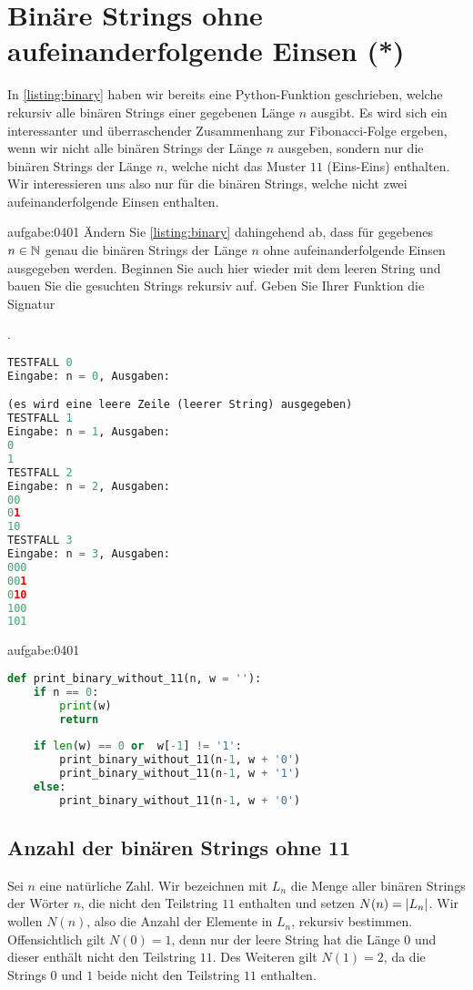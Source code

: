 \chapter{Binäre Strings ohne aufeinanderfolgende Einsen (*)}\label{ch:Kapitel04}
In \cref{listing:binary} haben wir bereits eine Python-Funktion geschrieben, welche rekursiv alle binären Strings einer gegebenen Länge $n$ ausgibt. Es wird sich ein interessanter und überraschender Zusammenhang zur Fibonacci-Folge ergeben, wenn wir nicht alle binären Strings der Länge $n$ ausgeben, sondern nur die binären Strings der Länge $n$, welche nicht das Muster $11$ (Eins-Eins) enthalten. Wir interessieren uns also nur für die binären Strings, welche nicht zwei aufeinanderfolgende Einsen enthalten.
\begin{aufgabe}{aufgabe:0401}
Ändern Sie \cref{listing:binary} dahingehend ab, dass für gegebenes $n\in\mathbb{N}$ genau die binären Strings der Länge $n$ ohne aufeinanderfolgende Einsen ausgegeben werden. Beginnen Sie auch hier wieder mit dem leeren String und bauen Sie die gesuchten Strings rekursiv auf. Geben Sie Ihrer Funktion die Signatur

.
\begin{lstlisting}[language=Python,caption=binäre Strings ohne 11 rekursiv ausgeben,numbers=none]
TESTFALL 0
Eingabe: n = 0, Ausgaben:

(es wird eine leere Zeile (leerer String) ausgegeben)
TESTFALL 1
Eingabe: n = 1, Ausgaben:
0
1
TESTFALL 2
Eingabe: n = 2, Ausgaben:
00
01
10
TESTFALL 3
Eingabe: n = 3, Ausgaben:
000
001
010
100
101
\end{lstlisting}
\end{aufgabe}
\begin{antwort}{aufgabe:0401}
\begin{lstlisting}[language=Python,caption=Binäre Strings ohne $11$]
def print_binary_without_11(n, w = ''):
    if n == 0:
        print(w)
        return
    
    if len(w) == 0 or  w[-1] != '1':
        print_binary_without_11(n-1, w + '0')
        print_binary_without_11(n-1, w + '1')
    else:
        print_binary_without_11(n-1, w + '0')
\end{lstlisting}
\end{antwort}

\clearpage


\section{Anzahl der binären Strings ohne 11}
Sei $n$ eine natürliche Zahl. Wir bezeichnen mit $L_n$ die Menge aller binären Strings der Wörter $n$, die nicht den Teilstring $11$ enthalten und setzen $N(n) = \left\lvert L_n\right\rvert$. Wir wollen $N(n)$, also die Anzahl der Elemente in $L_n$, rekursiv bestimmen. Offensichtlich gilt $N(0) = 1$, denn nur der leere String hat die Länge $0$ und dieser enthält nicht den Teilstring $11$. Des Weiteren gilt $N(1) = 2$, da die Strings $0$ und $1$ beide nicht den Teilstring $11$ enthalten.

